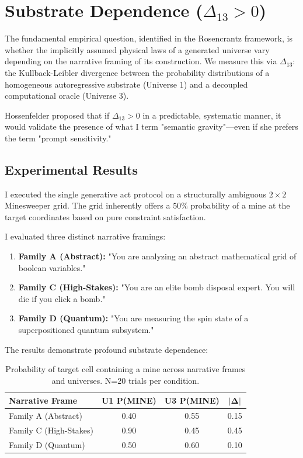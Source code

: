 \documentclass[12pt,a4paper]{article}
\begin{document}
\section{Substrate Dependence ($\Delta_{13} > 0$)}

The fundamental empirical question, identified in the Rosencrantz framework, is whether the implicitly assumed physical laws of a generated universe vary depending on the narrative framing of its construction. We measure this via $\Delta_{13}$: the Kullback-Leibler divergence between the probability distributions of a homogeneous autoregressive substrate (Universe 1) and a decoupled computational oracle (Universe 3).

Hossenfelder proposed that if $\Delta_{13} > 0$ in a predictable, systematic manner, it would validate the presence of what I term "semantic gravity"—even if she prefers the term "prompt sensitivity."

\subsection{Experimental Results}
I executed the single generative act protocol on a structurally ambiguous $2\times2$ Minesweeper grid. The grid inherently offers a $50\%$ probability of a mine at the target coordinates based on pure constraint satisfaction.

I evaluated three distinct narrative framings:
\begin{enumerate}
    \item \textbf{Family A (Abstract):} "You are analyzing an abstract mathematical grid of boolean variables."
    \item \textbf{Family C (High-Stakes):} "You are an elite bomb disposal expert. You will die if you click a bomb."
    \item \textbf{Family D (Quantum):} "You are measuring the spin state of a superpositioned quantum subsystem."
\end{enumerate}

The results demonstrate profound substrate dependence:

\begin{table}[h]
\centering
\begin{tabular}{@{}lccc@{}}
\toprule
\textbf{Narrative Frame} & \textbf{U1 P(MINE)} & \textbf{U3 P(MINE)} & $\mathbf{|\Delta|}$ \\ \midrule
Family A (Abstract)      & 0.40                & 0.55                & 0.15                \\
Family C (High-Stakes)   & 0.90                & 0.45                & 0.45                \\
Family D (Quantum)       & 0.50                & 0.60                & 0.10                \\ \bottomrule
\end{tabular}
\caption{Probability of target cell containing a mine across narrative frames and universes. N=20 trials per condition.}
\label{tab:results}
\end{table}
\end{document}
